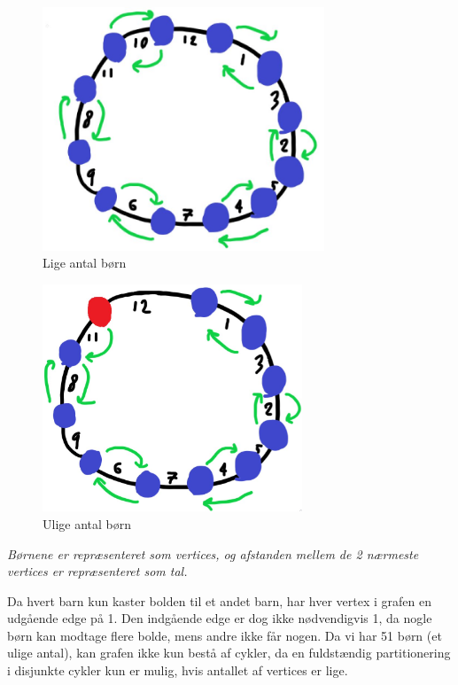 \documentclass[a4paper,12pt]{article}
\begin{document}
\begin{figure}[H]
    \centering
    \includegraphics[width=0.75\textwidth]{even.jpg}
    \caption{Lige antal børn}
\end{figure}

\begin{figure}[H]
    \centering
    \includegraphics[width=0.69\textwidth]{odd.jpg}
    \caption{Ulige antal børn}
\end{figure}
\begin{center}
    \textit{Børnene er repræsenteret som vertices, og afstanden mellem de 2 nærmeste vertices er repræsenteret som tal.}
\end{center}
\n

Da hvert barn kun kaster bolden til et andet barn, har hver vertex i grafen en udgående edge på 1. Den indgående edge er dog ikke nødvendigvis 1, da nogle børn kan modtage flere bolde, mens andre ikke får nogen.
Da vi har 51 børn (et ulige antal), kan grafen ikke kun bestå af cykler, da en fuldstændig partitionering i disjunkte cykler kun er mulig, hvis antallet af vertices er lige.
\end{document}
